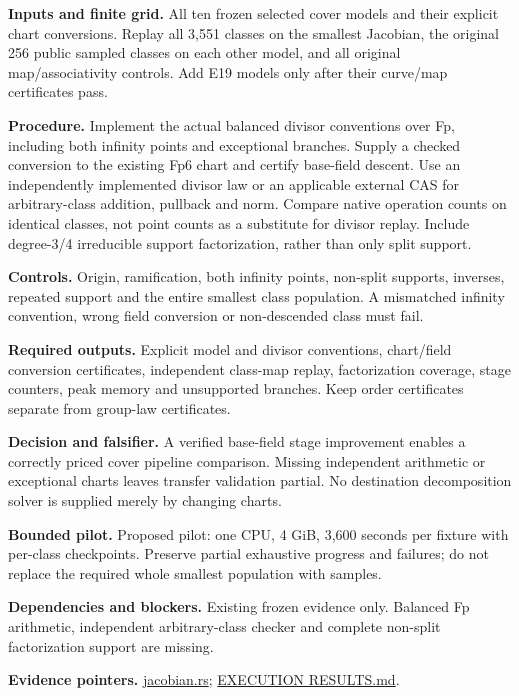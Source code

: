 \documentclass[
  10pt,
]{article}
\begin{document}
\textbf{Inputs and finite grid.} All ten frozen selected cover models
and their explicit chart conversions. Replay all 3,551 classes on the
smallest Jacobian, the original 256 public sampled classes on each other
model, and all original map/associativity controls. Add E19 models only
after their curve/map certificates pass.

\textbf{Procedure.} Implement the actual balanced divisor conventions
over Fp, including both infinity points and exceptional branches. Supply
a checked conversion to the existing Fp6 chart and certify base-field
descent. Use an independently implemented divisor law or an applicable
external CAS for arbitrary-class addition, pullback and norm. Compare
native operation counts on identical classes, not point counts as a
substitute for divisor replay. Include degree-3/4 irreducible support
factorization, rather than only split support.

\textbf{Controls.} Origin, ramification, both infinity points, non-split
supports, inverses, repeated support and the entire smallest class
population. A mismatched infinity convention, wrong field conversion or
non-descended class must fail.

\textbf{Required outputs.} Explicit model and divisor conventions,
chart/field conversion certificates, independent class-map replay,
factorization coverage, stage counters, peak memory and unsupported
branches. Keep order certificates separate from group-law certificates.

\textbf{Decision and falsifier.} A verified base-field stage improvement
enables a correctly priced cover pipeline comparison. Missing
independent arithmetic or exceptional charts leaves transfer validation
partial. No destination decomposition solver is supplied merely by
changing charts.

\textbf{Bounded pilot.} Proposed pilot: one CPU, 4 GiB, 3,600 seconds
per fixture with per-class checkpoints. Preserve partial exhaustive
progress and failures; do not replace the required whole smallest
population with samples.

\textbf{Dependencies and blockers.} Existing frozen evidence only.
Balanced Fp arithmetic, independent arbitrary-class checker and complete
non-split factorization support are missing.

\textbf{Evidence pointers.}
\href{../../../research/twist_routes_1_3_20261021/runner/src/jacobian.rs}{jacobian.rs};
\href{../../../research/twist_routes_1_3_20261021/reports/EXECUTION_RESULTS.md}{EXECUTION
RESULTS.md}.
\end{document}
